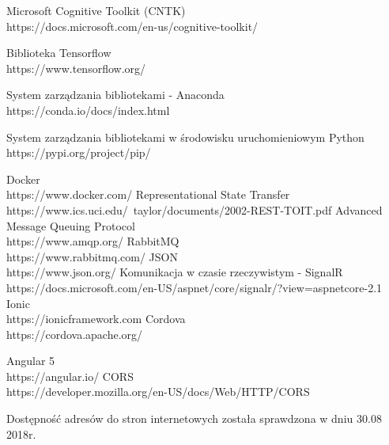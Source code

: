 \begin{thebibliography}{1}
 Microsoft Cognitive Toolkit (CNTK)
\\
https://docs.microsoft.com/en-us/cognitive-toolkit/

 Biblioteka Tensorflow
\\
https://www.tensorflow.org/

 System zarządzania bibliotekami - Anaconda
\\
https://conda.io/docs/index.html

 System zarządzania bibliotekami w środowisku uruchomieniowym Python
\\
https://pypi.org/project/pip/


 Docker
\\
https://www.docker.com/
 Representational State Transfer
\\
https://www.ics.uci.edu/~taylor/documents/2002-REST-TOIT.pdf
Advanced Message Queuing Protocol
\\
https://www.amqp.org/
 RabbitMQ
\\
https://www.rabbitmq.com/
 JSON
\\
https://www.json.org/
 Komunikacja w czasie rzeczywistym - SignalR
\\
https://docs.microsoft.com/en-US/aspnet/core/signalr/?view=aspnetcore-2.1
 Ionic
\\
https://ionicframework.com
 Cordova
\\
https://cordova.apache.org/

 Angular 5
\\
https://angular.io/
CORS
\\
https://developer.mozilla.org/en-US/docs/Web/HTTP/CORS



\end{thebibliography}

Dostępność adresów do stron internetowych została sprawdzona w dniu 30.08 2018r.